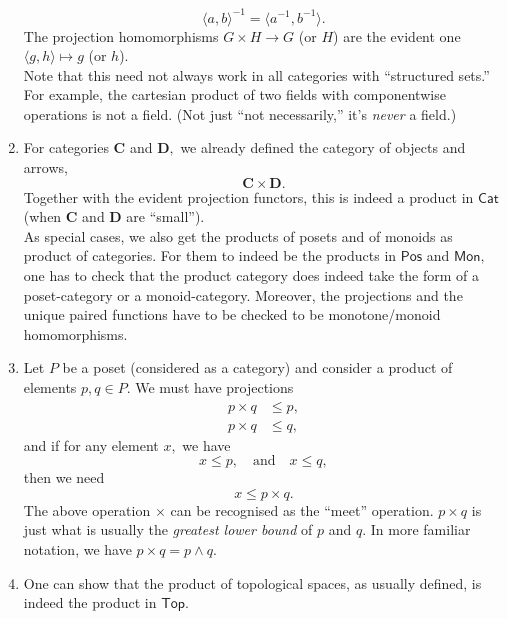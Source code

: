 \begin{enumerate}
\begin{equation*}
		\langle a, b\rangle^{-1} = \langle a^{-1}, b^{-1}\rangle.
	\end{equation*}
	The projection homomorphisms $G\times H \to G$ (or $H$) are the evident one $\langle g, h\rangle \mapsto g$ (or $h$).\\
	Note that this need not always work in all categories with ``structured sets.'' For example, the cartesian product of two fields with componentwise operations is not a field. (Not just ``not necessarily,'' it's \emph{never} a field.)
	\item For categories $\mathbf{C}$ and $\mathbf{D},$	we already defined the category of objects and arrows,
	\begin{equation*} 
		\mathbf{C} \times \mathbf{D}.
	\end{equation*}
	Together with the evident projection functors, this is indeed a product in $\mathsf{Cat}$ (when $\mathbf{C}$ and $\mathbf{D}$ are ``small'').\\
	As special cases, we also get the products of posets and of monoids as product of categories. For them to indeed be the products in $\mathsf{Pos}$ and $\mathsf{Mon},$ one has to check that the product category does indeed take the form of a poset-category or a monoid-category. Moreover, the projections and the unique paired functions have to be checked to be monotone/monoid homomorphisms.
	\item Let $P$ be a poset (considered as a category) and consider a product of elements $p, q \in P.$ We must have projections
	\begin{align*} 
		p \times q &\le p,\\
		p \times q &\le q,
	\end{align*}
	and if for any element $x,$ we have
	\begin{equation*} 
		x \le p, \quad \text{and} \quad x \le q,
	\end{equation*}
	then we need
	\begin{equation*} 
		x \le p \times q.
	\end{equation*}
	The above operation $\times$ can be recognised as the ``meet'' operation. $p \times q$ is just what is usually the \emph{greatest lower bound} of $p$ and $q.$ In more familiar notation, we have $p\times q = p \wedge q.$
	\item One can show that the product of topological spaces, as usually defined, is indeed the product in $\mathsf{Top}.$
\end{enumerate}
%
%
